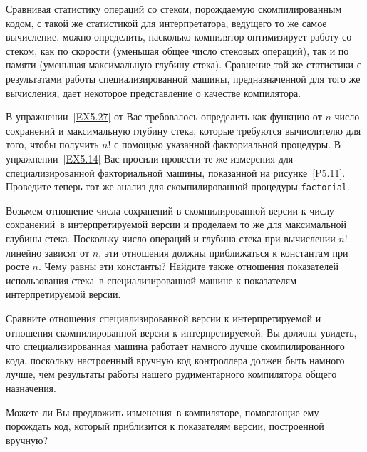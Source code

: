 \begin{exercise}{5.45}%
\label{EX5.45}%
Сравнивая статистику операций со стеком, порождаемую
скомпилированным кодом, с такой же статистикой для интерпретатора,
ведущего то же самое вычисление, можно определить, насколько
компилятор оптимизирует работу со стеком, как по скорости (уменьшая
общее число стековых операций), так и по памяти (уменьшая максимальную
глубину стека).  Сравнение той же статистики с результатами работы
специализированной машины, предназначенной для того же вычисления,
дает некоторое представление о качестве компилятора.

\begin{plainenum}

\item
В упражнении~\ref{EX5.27} от Вас
требовалось определить как функцию от $n$ число
сохранений и максимальную глубину стека, которые требуются вычислителю
для того, чтобы получить $n!$ с помощью указанной
факториальной процедуры.  В упражнении~\ref{EX5.14} Вас
просили провести те же измерения для специализированной факториальной
машины, показанной на рисунке~\ref{P5.11}.  Проведите
теперь тот же анализ для скомпилированной процедуры
{\tt factorial}.

Возьмем отношение числа сохранений в
скомпилированной версии к числу сохранений~в интерпретируемой версии
и проделаем то же для максимальной глубины стека.  Поскольку число
операций и глубина стека при вычислении $n!$ линейно зависят
от $n$, эти отношения должны приближаться к константам при
росте $n$.  Чему равны эти константы?  Найдите также
отношения показателей использования стека~в специализированной
машине к показателям интерпретируемой версии.

Сравните отношения специализированной версии к
интерпретируемой и отношения скомпилированной версии к
интерпретируемой.  Вы должны увидеть, что специализированная машина
работает намного лучше скомпилированного кода, поскольку настроенный
вручную код контроллера должен быть намного лучше, чем результаты
работы нашего рудиментарного компилятора общего назначения.

\item
Можете ли Вы предложить изменения~в компиляторе,
помогающие ему порождать код, который приблизится к показателям
версии, построенной вручную?
\end{plainenum}
\end{exercise}
